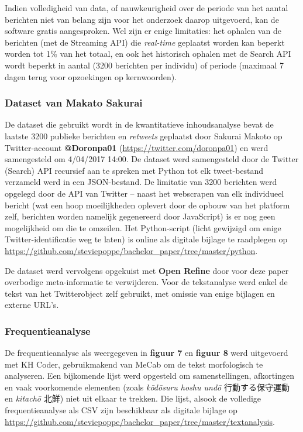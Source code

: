 \documentclass[10.5pt,dutch,]{article}
\begin{document}
Indien volledigheid van data, of nauwkeurigheid over de periode van het
aantal berichten niet van belang zijn voor het onderzoek daarop
uitgevoerd, kan de software gratis aangesproken. Wel zijn er enige
limitaties: het ophalen van de berichten (met de Streaming API) die
\emph{real-time} geplaatst worden kan beperkt worden tot 1\% van het
totaal, en ook het historisch ophalen met de Search API wordt beperkt in
aantal (3200 berichten per individu) of periode (maximaal 7 dagen terug
voor opzoekingen op kernwoorden).

\subsubsection{Dataset van Makato
Sakurai}\label{dataset-van-makato-sakurai}

De dataset die gebruikt wordt in de kwantitatieve inhoudsanalyse bevat
de laatste 3200 publieke berichten en \emph{retweets} geplaatst door
Sakurai Makoto op Twitter-account \textbf{@Doronpa01}
(\url{https://twitter.com/doronpa01}) en werd samengesteld om 4/04/2017
14:00. De dataset werd samengesteld door de Twitter (Search) API
recursief aan te spreken met Python tot elk tweet-bestand verzameld werd
in een JSON-bestand. De limitatie van 3200 berichten werd opgelegd door
de API van Twitter -- naast het webscrapen van elk individueel bericht
(wat een hoop moeilijkheden oplevert door de opbouw van het platform
zelf, berichten worden namelijk gegenereerd door JavaScript) is er nog geen
mogelijkheid om die te omzeilen. Het Python-script (licht gewijzigd om
enige Twitter-identificatie weg te laten) is online als digitale bijlage
te raadplegen op
\url{https://github.com/steviepoppe/bachelor_paper/tree/master/python}.

De dataset werd vervolgens opgekuist met \textbf{Open Refine} door voor
deze paper overbodige meta-informatie te verwijderen. Voor de
tekstanalyse werd enkel de tekst van het Twitterobject zelf gebruikt,
met omissie van enige bijlagen en externe URL's.

\subsubsection{Frequentieanalyse}\label{frequentieanalyse}

De frequentieanalyse als weergegeven in \textbf{figuur 7} en
\textbf{figuur 8} werd uitgevoerd met KH Coder, gebruikmakend van MeCab
om de tekst morfologisch te analyseren. Een bijkomende lijst werd
opgesteld om samenstellingen, afkortingen en vaak voorkomende elementen
(zoals \emph{kōdōsuru hoshu undō} 行動する保守運動 en \emph{kitachō}
北鮮) niet uit elkaar te trekken. Die lijst, alsook de volledige
frequentieanalyse als CSV zijn beschikbaar als digitale bijlage op
\url{https://github.com/steviepoppe/bachelor_paper/tree/master/textanalysis}.
\end{document}
